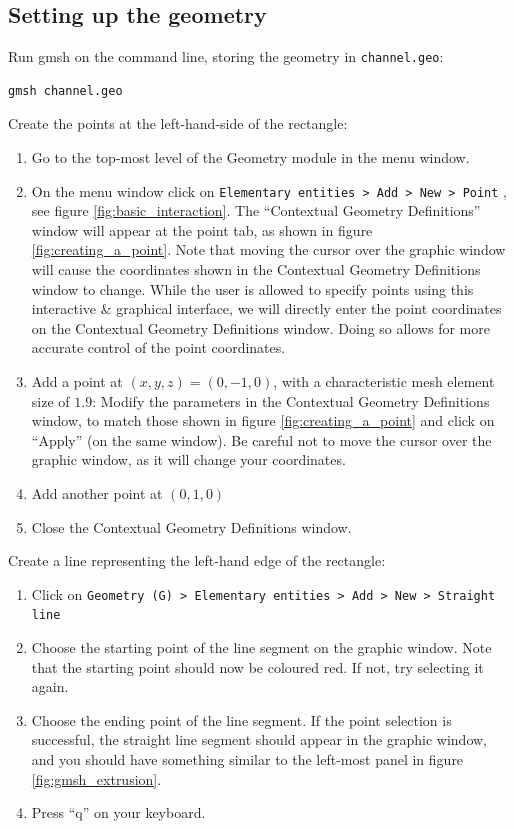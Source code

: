 \subsection{Setting up the geometry}
\label{ssect:setting_up_geometry}
\par
\par
Run gmsh on the command line, storing the geometry in \lstinline{channel.geo}:
\begin{lstlisting}
gmsh channel.geo
\end{lstlisting}
\par
Create the points at the left-hand-side of the rectangle:
\begin{enumerate}
  \item Go to the top-most level of the Geometry module in the menu window.
  \item On the menu window click on \lstinline{Elementary entities > Add > New > Point} , see
        figure \ref{fig:basic_interaction}. The ``Contextual Geometry Definitions'' window will
        appear at the point tab, as shown in figure \ref{fig:creating_a_point}.
        Note that  moving the cursor over the graphic window will cause the coordinates shown in
        the Contextual Geometry Definitions window to change. While the user is allowed to specify
        points using this interactive \& graphical interface, we will directly enter the point
        coordinates on the Contextual Geometry Definitions window. Doing so allows for more accurate
        control of the point coordinates.
  \item Add a point at $(x,y,z)=(0,-1,0)$, with a characteristic mesh element size of $1.9$: Modify the
        parameters in the Contextual Geometry Definitions window, to match those shown in
        figure \ref{fig:creating_a_point} and click on ``Apply'' (on the same window). Be careful not
        to move the cursor over the graphic window, as it will change your coordinates.
  \item Add another point at $(0,1,0)$
  \item Close the Contextual Geometry Definitions window.
\end{enumerate}
\par
Create a line representing the left-hand edge of the rectangle:
\begin{enumerate}
  \item Click on \lstinline{Geometry (G) > Elementary entities > Add > New > Straight line}
  \item Choose the starting point of the line segment on the graphic window. Note that the
        starting point should now be coloured red. If not, try selecting it again.
  \item Choose the ending point of the line segment. If the point selection is successful,
        the straight line segment should appear in the graphic window, and you should have
        something similar to the left-most panel in figure \ref{fig:gmsh_extrusion}.
  \item Press ``q'' on your keyboard.
\end{enumerate}
